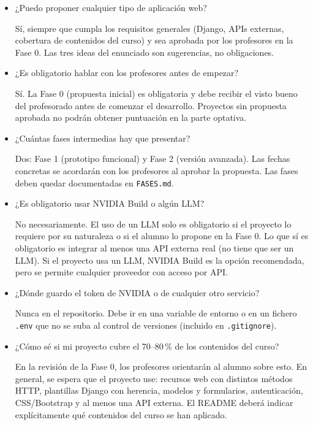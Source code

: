 \begin{itemize}

\item ¿Puedo proponer cualquier tipo de aplicación web?

  Sí, siempre que cumpla los requisitos generales (Django, APIs externas, cobertura de contenidos del curso) y sea aprobada por los profesores en la Fase 0. Las tres ideas del enunciado son sugerencias, no obligaciones.

\item ¿Es obligatorio hablar con los profesores antes de empezar?

  Sí. La Fase 0 (propuesta inicial) es obligatoria y debe recibir el visto bueno del profesorado antes de comenzar el desarrollo. Proyectos sin propuesta aprobada no podrán obtener puntuación en la parte optativa.

\item ¿Cuántas fases intermedias hay que presentar?

  Dos: Fase 1 (prototipo funcional) y Fase 2 (versión avanzada). Las fechas concretas se acordarán con los profesores al aprobar la propuesta. Las fases deben quedar documentadas en \texttt{FASES.md}.

\item ¿Es obligatorio usar NVIDIA Build o algún LLM?

  No necesariamente. El uso de un LLM solo es obligatorio si el proyecto lo requiere por su naturaleza o si el alumno lo propone en la Fase 0. Lo que sí es obligatorio es integrar al menos una API externa real (no tiene que ser un LLM). Si el proyecto usa un LLM, NVIDIA Build es la opción recomendada, pero se permite cualquier proveedor con acceso por API.

\item ¿Dónde guardo el token de NVIDIA o de cualquier otro servicio?

  Nunca en el repositorio. Debe ir en una variable de entorno o en un fichero \verb|.env| que no se suba al control de versiones (incluido en \verb|.gitignore|).

\item ¿Cómo sé si mi proyecto cubre el 70--80\,\% de los contenidos del curso?

  En la revisión de la Fase 0, los profesores orientarán al alumno sobre esto. En general, se espera que el proyecto use: recursos web con distintos métodos HTTP, plantillas Django con herencia, modelos y formularios, autenticación, CSS/Bootstrap y al menos una API externa. El README deberá indicar explícitamente qué contenidos del curso se han aplicado.


\end{itemize}
